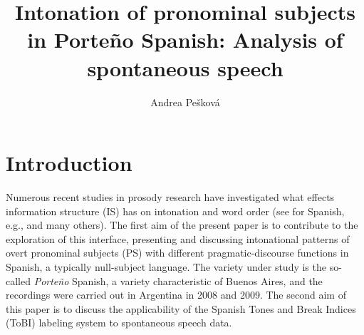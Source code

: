 \documentclass[output=paper]{langsci/langscibook}
\author{Andrea Pešková\affiliation{Universität Osnabrück}}
\title{Intonation of pronominal subjects in Porte{\~n}o Spanish: Analysis of spontaneous speech}
\subtitle{}
\begin{document}
 \label{chap:pes}\label{ch:2}




\section{Introduction}
\label{sec:pes:1}
Numerous recent studies in prosody research have investigated what effects information structure (IS) has on intonation and word order (see for Spanish, e.g., \citealt{Face2001,Gabriel2010article,Vanrell.unpublished,Uth2014} and many others). The first aim of the present paper is to contribute to the exploration of this interface, presenting and discussing intonational patterns of overt pronominal subjects (PS) with different pragmatic-discourse functions in Spanish, a typically null-subject language. The variety under study is the so-called \textit{Porte{\~n}o} Spanish, a variety characteristic of Buenos Aires, and the recordings were carried out in Argentina in 2008 and 2009. The second aim of this paper is to discuss the applicability of the Spanish Tones and Break Indices (ToBI) labeling system to spontaneous speech data.
\end{document}
